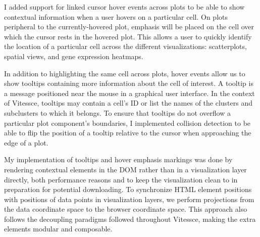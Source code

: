 \documentclass[12pt, letterpaper]{article}
\begin{document}
I added support for linked cursor hover events across plots to be able to show contextual information when a user hovers on a particular cell.
On plots peripheral to the currently-hovered plot, emphasis will be placed on the cell over which the cursor rests in the hovered plot.
This allows a user to quickly identify the location of a particular cell across the different visualizations: scatterplots, spatial views, and gene expression heatmaps.

In addition to highlighting the same cell across plots, hover events allow us to show tooltips containing more information about the cell of interest.
A tooltip is a message positioned near the mouse in a graphical user interface.
In the context of Vitessce, tooltips may contain a cell's ID or list the names of the clusters and subclusters to which it belongs.
To ensure that tooltips do not overflow a particular plot component's boundaries, I implemented collision detection to be able to flip the position of a tooltip relative to the cursor when approaching the edge of a plot.

My implementation of tooltips and hover emphasis markings was done by rendering contextual elements in the DOM rather than in a visualization layer directly, both performance reasons and to keep the visualization clean to in preparation for potential downloading.
To synchronize HTML element positions with positions of data points in visualization layers, we perform projections from the data coordinate space to the browser coordinate space.
This approach also follows the decoupling paradigms followed throughout Vitessce, making the extra elements modular and composable.
\end{document}
